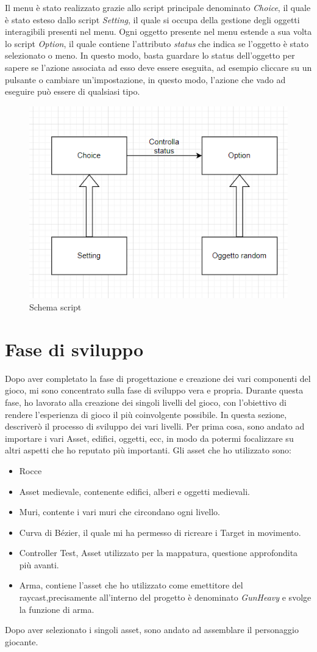\documentclass[
a4paper,
cleardoublepage=empty,
headings=twolinechapter,
numbers=autoenddot,
]{scrbook}
\begin{document}
    Il menu è stato realizzato grazie allo script principale denominato \textit{Choice}, il quale è stato esteso dallo script \textit{Setting}, il quale si occupa della gestione degli oggetti interagibili presenti nel menu. Ogni oggetto presente nel menu estende a sua volta lo script \textit{Option}, il quale contiene l'attributo \textit{status} che indica se l'oggetto è stato selezionato o meno. In questo modo, basta guardare lo status dell'oggetto per sapere se l'azione associata ad esso deve essere eseguita, ad esempio cliccare su un pulsante o cambiare un'impostazione, in questo modo, l'azione che vado ad eseguire può essere di qualsiasi tipo.
	\begin{figure}[h]
		\centering
		\includegraphics[width=0.6\linewidth]{image/funzionamento menu}
		\caption{Schema script}
		\label{fig:menu_funzionamento}
    \end{figure}
	\section{Fase di sviluppo}
	Dopo aver completato la fase di progettazione e creazione dei vari componenti del gioco, mi sono concentrato sulla fase di sviluppo vera e propria. Durante questa fase, ho lavorato alla creazione dei singoli livelli del gioco, con l'obiettivo di rendere l'esperienza di gioco il più coinvolgente possibile. In questa sezione, descriverò il processo di sviluppo dei vari livelli.
	Per prima cosa, sono andato ad importare i vari Asset, edifici, oggetti, ecc, in modo da potermi focalizzare su altri aspetti che ho reputato più importanti.
	Gli asset che ho utilizzato sono:
	\begin{itemize}
		\item Rocce\cite{Rock_asset}
		\item Asset medievale\cite{Pack_asset}, contenente edifici, alberi e oggetti medievali. 
		\item Muri\cite{Wall_asset}, contente i vari muri che circondano ogni livello.
		\item Curva di Bézier\cite{Pack_asset}, il quale mi ha permesso di ricreare i Target in movimento.
		\item Controller Test\cite{Controller_test}, Asset utilizzato per la mappatura, questione approfondita più avanti.
		\item Arma\cite{pistola}, contiene l'asset che ho utilizzato come emettitore del raycast,precisamente all'interno del progetto è denominato \textit{GunHeavy} e svolge la funzione di arma.
	\end{itemize}
	Dopo aver selezionato i singoli asset, sono andato ad assemblare il personaggio giocante.
\end{document}
